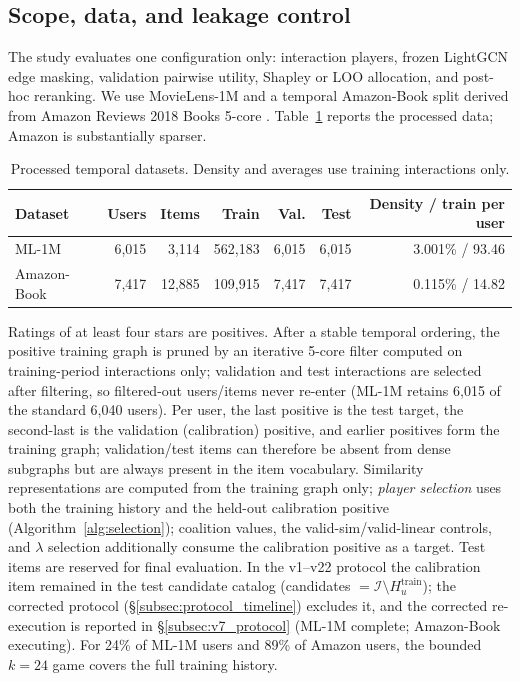 \documentclass[pdflatex,sn-mathphys-num]{sn-jnl}
\begin{document}
\subsection{Scope, data, and leakage control}\label{subsec:leakage}\label{subsec:case_scope}\label{subsec:data_splits}

The study evaluates one configuration only: interaction players, frozen LightGCN edge masking, validation pairwise utility, Shapley or LOO allocation, and post-hoc reranking. We use MovieLens-1M \cite{harper2015movielens} and a temporal Amazon-Book split derived from Amazon Reviews 2018 Books 5-core \cite{ni2019justifying}. Table~\ref{tab:datasets} reports the processed data; Amazon is substantially sparser.

\begin{table}[t]
\caption{Processed temporal datasets. Density and averages use training interactions only.}\label{tab:datasets}
\centering
\small
\begin{tabular}{lrrrrrr}
\toprule
Dataset & Users & Items & Train & Val. & Test & Density / train per user \\
\midrule
ML-1M & 6{,}015 & 3{,}114 & 562{,}183 & 6{,}015 & 6{,}015 & 3.001\% / 93.46 \\
Amazon-Book & 7{,}417 & 12{,}885 & 109{,}915 & 7{,}417 & 7{,}417 & 0.115\% / 14.82 \\
\bottomrule
\end{tabular}
\end{table}

Ratings of at least four stars are positives. After a stable temporal ordering, the positive training graph is pruned by an iterative 5-core filter computed on training-period interactions only; validation and test interactions are selected after filtering, so filtered-out users/items never re-enter (ML-1M retains 6{,}015 of the standard 6{,}040 users). Per user, the last positive is the test target, the second-last is the validation (calibration) positive, and earlier positives form the training graph; validation/test items can therefore be absent from dense subgraphs but are always present in the item vocabulary. Similarity representations are computed from the training graph only; \emph{player selection} uses both the training history and the held-out calibration positive (Algorithm~\ref{alg:selection}); coalition values, the valid-sim/valid-linear controls, and $\lambda$ selection additionally consume the calibration positive as a target. Test items are reserved for final evaluation. In the v1--v22 protocol the calibration item remained in the test candidate catalog (candidates $=\mathcal{I}\setminus H_u^{\mathrm{train}}$); the corrected protocol (\S\ref{subsec:protocol_timeline}) excludes it, and the corrected re-execution is reported in \S\ref{subsec:v7_protocol} (ML-1M complete; Amazon-Book executing). For 24\% of ML-1M users and 89\% of Amazon users, the bounded $k=24$ game covers the full training history.
\end{document}
